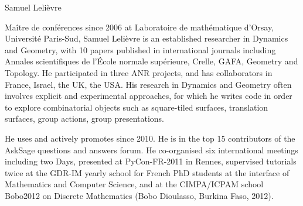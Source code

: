 \begin{participant}[type=R,PM=6,gender=male]{Samuel Lelièvre}

Maître de conférences since 2006 at
Laboratoire de mathématique d'Orsay, Université Paris-Sud,
Samuel Lelièvre is an established researcher in Dynamics and Geometry,
with 10 papers published in international journals including
Annales scientifiques de l'École normale supérieure,
Crelle, GAFA, Geometry and Topology.
He participated in three ANR projects, and has collaborators
in France, Israel, the UK, the USA.
His research in Dynamics and Geometry
often involves explicit and experimental approaches,
for which he writes code in order to explore
combinatorial objects such as square-tiled surfaces,
translation surfaces, group actions, group presentations.

He uses and actively promotes \Sage since 2010.
He is in the top 15 contributors of the AskSage
questions and answers forum.
He co-organised six international meetings including two \Sage Days,
presented \Sage at PyCon-FR-2011 in Rennes,
supervised \Sage tutorials twice at the GDR-IM yearly school
for French PhD students at the interface of Mathematics and
Computer Science, and at the CIMPA/ICPAM school Bobo2012
on Discrete Mathematics (Bobo Dioulasso, Burkina Faso, 2012).
\end{participant}
